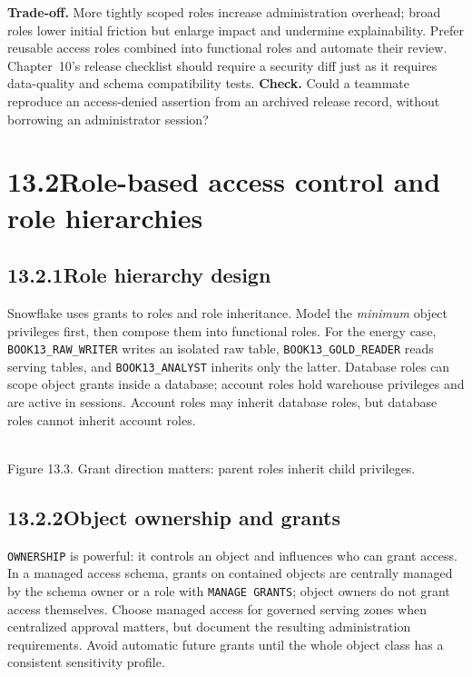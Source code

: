 \documentclass[11pt,twoside]{article}
\newcommand{\topic}[2]{\subsection*{#1\quad #2}}
\begin{document}
\textbf{Trade-off.} More tightly scoped roles increase administration overhead; broad roles lower initial friction but enlarge impact and undermine explainability. Prefer reusable access roles combined into functional roles and automate their review. Chapter~10's release checklist should require a security diff just as it requires data-quality and schema compatibility tests.
\textbf{Check.} Could a teammate reproduce an access-denied assertion from an archived release record, without borrowing an administrator session?
\newpage
\section*{13.2\quad Role-based access control and role hierarchies}
\topic{13.2.1}{Role hierarchy design}
Snowflake uses grants to roles and role inheritance. Model the \emph{minimum} object privileges first, then compose them into functional roles. For the energy case, \texttt{BOOK13\_RAW\_WRITER} writes an isolated raw table, \texttt{BOOK13\_GOLD\_READER} reads serving tables, and \texttt{BOOK13\_ANALYST} inherits only the latter. Database roles can scope object grants inside a database; account roles hold warehouse privileges and are active in sessions. Account roles may inherit database roles, but database roles cannot inherit account roles.
\begin{center}\\{\fontsize{8}{9}\selectfont\color{inkgray}Figure 13.3. Grant direction matters: parent roles inherit child privileges.}\end{center}
\topic{13.2.2}{Object ownership and grants}
\texttt{OWNERSHIP} is powerful: it controls an object and influences who can grant access. In a managed access schema, grants on contained objects are centrally managed by the schema owner or a role with \texttt{MANAGE GRANTS}; object owners do not grant access themselves. Choose managed access for governed serving zones when centralized approval matters, but document the resulting administration requirements. Avoid automatic future grants until the whole object class has a consistent sensitivity profile.
\end{document}
